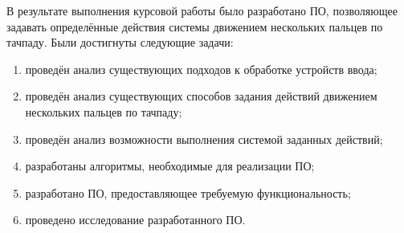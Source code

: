 
В результате выполнения курсовой работы было разработано ПО, позволяющее задавать определённые действия системы движением нескольких пальцев по тачпаду. Были достигнуты следующие задачи:
\begin{enumerate}
	\item проведён анализ существующих подходов к обработке устройств ввода;
	\item проведён анализ существующих способов задания действий движением нескольких пальцев по тачпаду;
	\item проведён анализ возможности выполнения системой заданных действий;
	\item разработаны алгоритмы, необходимые для реализации ПО;
	\item разработано ПО, предоставляющее требуемую функциональность;
	\item проведено исследование разработанного ПО.
\end{enumerate}

\clearpage